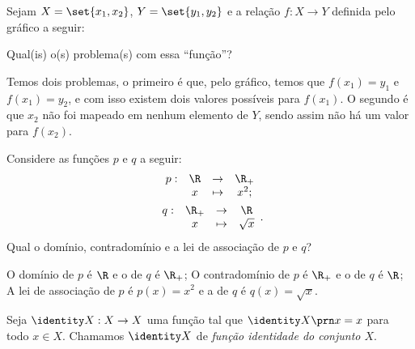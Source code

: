 \begin{example}
Sejam $X = \set{x_1, x_2}$, $Y = \set{y_1, y_2}$ e a relação $f : X \to Y$ definida pelo gráfico a seguir:
\begin{center}
\end{center}
Qual(is) o(s) problema(s) com essa ``função''?
\end{example}
\begin{solution}
Temos dois problemas, o primeiro é que, pelo gráfico, temos que $f(x_1) = y_1$ e $f(x_1) = y_2$, e com isso existem dois valores possíveis para $f(x_1)$. O segundo é que $x_2$ não foi mapeado em nenhum elemento de $Y$, sendo assim não há um valor para $f(x_2)$.
\end{solution}


\begin{example}
\label{example:func-sq-sqrt}
Considere as funções $p$ e $q$ a seguir:
%
\begin{gather*}
\begin{array}{cccc}
p : & \R & \to     & \R_+ \\
     &  x & \mapsto & x^2;
\end{array}\\
\begin{array}{cccc}
q : & \R_+ & \to     & \R \\
     &  x & \mapsto & \sqrt x
\end{array}.
\end{gather*}
%
Qual o domínio, contradomínio e a lei de associação de $p$ e $q$?
\end{example}

\begin{solution}
O domínio de $p$ é $\R$ e o de $q$ é $\R_+$; 
O contradomínio de $p$ é $\R_+$ e o de $q$ é $\R$; 
A lei de associação de $p$ é $p(x)=x^2$ e a de $q$ é $q(x)=\sqrt x$.
\end{solution}

\begin{definition}
\label{def:funcao-identidade-conjunto}
Seja $\identity X : X \to X $ uma função tal que $\identity X \prn x = x$ para todo $x \in X$. Chamamos $\identity X$ de \emph{função identidade do conjunto $X$}.
\end{definition}